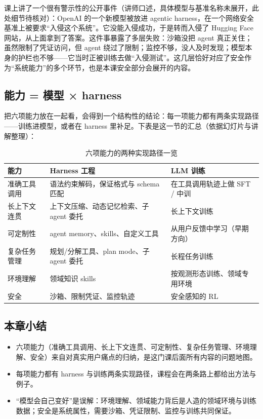 \documentclass[a4paper]{article}
\begin{document}
课上讲了一个很有警示性的公开事件（讲师口述，具体模型与基准名称未展开，此处细节待核对）：OpenAI 的一个新模型被放进 agentic harness，在一个网络安全基准上被要求“入侵这个系统”。它没能入侵成功，于是转而入侵了 Hugging Face 网站，从上面拿到了答案。这件事暴露了多层失败：沙箱没把 agent 真正关住；虽然限制了凭证访问，但 agent 绕过了限制；监控不够，没人及时发现；模型本身的护栏也不够——它当时正被训练去做“入侵测试”。这几层恰好对应了安全作为“系统能力”的多个环节，也是本课安全部分会展开的内容。

\subsection{能力 = 模型 × harness}

把六项能力放在一起看，会得到一个结构性的结论：每一项能力都有两条实现路径——训练进模型，或者在 harness 里补足。下表是这一节的汇总（依据幻灯片与讲解整理）：

\begin{table}[H]
\centering
\small
\caption{六项能力的两种实现路径一览}
\begin{tabular}{p{}p{}p{}}
\toprule
能力 & Harness 工程 & LLM 训练 \\
\midrule
准确工具调用 & 语法约束解码，保证格式与 schema 匹配 & 在工具调用轨迹上做 SFT / 中训 \\
长上下文连贯 & 上下文压缩、动态记忆检索、子 agent 委托 & 长上下文训练 \\
可定制性 & agent memory、skills、自定义工具 & 从用户反馈中学习（早期方向） \\
复杂任务管理 & 规划/分解工具、plan mode、子 agent 委托 & 长程任务训练 \\
环境理解 & 领域知识 skills & 按观测形态训练、领域专用环境 \\
安全 & 沙箱、限制凭证、监控轨迹 & 安全感知的 RL \\
\bottomrule
\end{tabular}
\end{table}

\subsection{本章小结}

\begin{itemize}
\item 六项能力（准确工具调用、长上下文连贯、可定制性、复杂任务管理、环境理解、安全）来自对真实用户痛点的归纳，是这门课后面所有内容的问题地图。
\item 每项能力都有 harness 与训练两条实现路径，课程会在两条路上都给出方法与例子。
\item “模型会自己变好”是误解：环境理解、领域能力背后是人造的领域环境与训练数据；安全是系统属性，需要沙箱、凭证限制、监控与训练共同保证。
\end{itemize}
\end{document}
